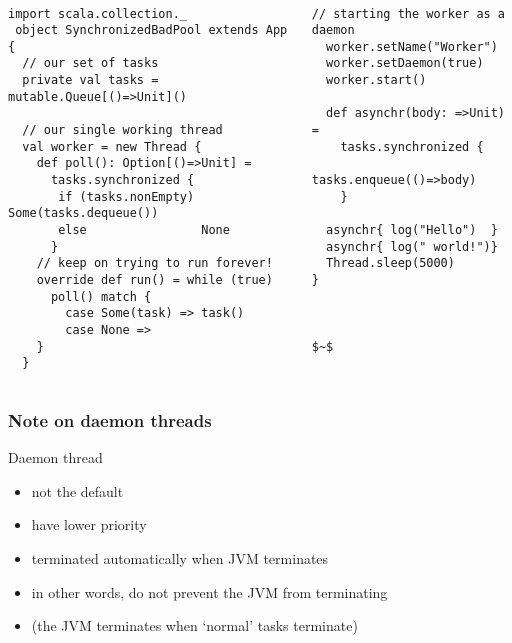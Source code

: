 \documentclass[aspectratio=169]{beamer}
\begin{document}
\begin{frame}[fragile]\frametitle{}
~\\[-8mm]
\begin{columns}
\begin{column}{0.65\textwidth}
\begin{lstlisting}[emph={synchronized,printUniqueIds,sleep,log,thread,join}]
 import scala.collection._
 object SynchronizedBadPool extends App {
  // our set of tasks
  private val tasks = mutable.Queue[()=>Unit]()
 
  // our single working thread
  val worker = new Thread {
    def poll(): Option[()=>Unit] = 
      tasks.synchronized {
       if (tasks.nonEmpty) Some(tasks.dequeue())
       else                None
      }
    // keep on trying to run forever!
    override def run() = while (true)
      poll() match {
        case Some(task) => task()
        case None =>
    }
  }
\end{lstlisting}
\end{column}
\begin{column}{0.40\textwidth}
\begin{lstlisting}[mathescape,emph={synchronized,sleep,log,thread,join}]
  // starting the worker as a daemon
  worker.setName("Worker")
  worker.setDaemon(true)
  worker.start()

  def asynchr(body: =>Unit) =
    tasks.synchronized {
      tasks.enqueue(()=>body)
    }

  asynchr{ log("Hello")  }
  asynchr{ log(" world!")}
  Thread.sleep(5000)
}



$~$
\end{lstlisting}
\end{column}
\end{columns}
\end{frame}


\begin{frame}\frametitle{Note on daemon threads}
  \begin{alertblock}{Daemon thread}
    \begin{itemize}
      \item not the default
      \item have lower priority
      \item terminated automatically when JVM terminates
      \item in other words, do not prevent the JVM from terminating
      \item (the JVM terminates when `normal' tasks terminate)
    \end{itemize}    
  \end{alertblock}
\end{frame}
\end{document}
